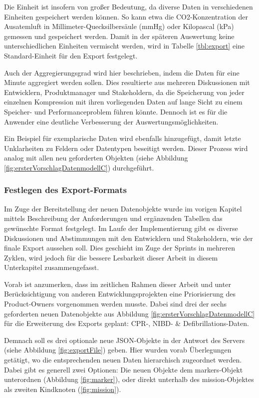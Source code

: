 Die Einheit ist insofern von großer Bedeutung, da diverse Daten in verschiedenen Einheiten gespeichert werden können.
So kann etwa die CO2-Konzentration der Ausatemluft in Millimeter-Quecksilbersäule (mmHg) oder Kilopascal (kPa) gemessen und gespeichert werden.
Damit in der späteren Auswertung keine unterschiedlichen Einheiten vermischt werden, wird in Tabelle \ref{tbl:export} eine Standard-Einheit für den Export festgelegt.

Auch der Aggregierungsgrad wird hier beschrieben, indem die Daten für eine Minute aggregiert werden sollen.
Dies resultierte aus mehreren Diskussionen mit Entwicklern, Produktmanager und Stakeholdern, da die Speicherung von jeder einzelnen Kompression mit ihren vorliegenden Daten auf lange Sicht zu einem Speicher- und Performanceproblem führen könnte.
Dennoch ist es für die Anwender eine deutliche Verbesserung der Auswertungsmöglichkeiten.

Ein Beispiel für exemplarische Daten wird ebenfalls hinzugefügt, damit letzte Unklarheiten zu Feldern oder Datentypen beseitigt werden.
Dieser Prozess wird analog mit allen neu geforderten Objekten (siehe Abbildung \ref{fig:ersterVorschlagDatenmodellC}) durchgeführt. 

\subsubsection{Festlegen des Export-Formats}
Im Zuge der Bereitstellung der neuen Datenobjekte wurde im vorigen Kapitel mittels Beschreibung der Anforderungen und ergänzenden Tabellen das gewünschte Format festgelegt.
Im Laufe der Implementierung gibt es diverse Diskussionen und Abstimmungen mit den Entwicklern und Stakeholdern, wie der finale Export aussehen soll.
Dies geschieht im Zuge der \glqq Sprints\grqq{} in mehreren Zyklen, wird jedoch für die bessere Lesbarkeit dieser Arbeit in diesem Unterkapitel zusammengefasst.

Vorab ist anzumerken, dass im zeitlichen Rahmen dieser Arbeit und unter Berücksichtigung von anderen Entwicklungsprojekten eine Priorisierung des Product-Owners vorgenommen werden musste.
Dabei sind drei der sechs geforderten neuen Datenobjekte aus Abbildung \ref{fig:ersterVorschlagDatenmodellC} für die Erweiterung des Exports  geplant: \gls{CPR}-, \gls{NIBD}- \& Defibrillations-Daten.

Demnach soll es drei optionale neue JSON-Objekte in der Antwort des Servers (siehe Abbildung \ref{fig:exportFile}) geben.
Hier wurden vorab Überlegungen getätigt, wo die entsprechenden neuen Daten hierarchisch zugeordnet werden.
Dabei gibt es generell zwei Optionen:
Die neuen Objekte dem \glqq markers\grqq-Objekt unterordnen (Abbildung \ref{fig:marker}), oder direkt unterhalb des \glqq mission\grqq-Objektes als zweiten Kindknoten (\ref{fig:mission}).

